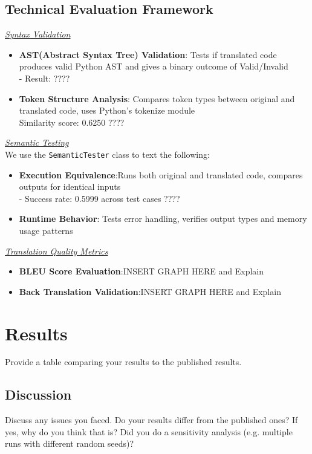 \documentclass[11pt,a4paper]{article}
\begin{document}
\subsection{Technical Evaluation Framework}
\textit{\underline{Syntax Validation}}
\begin{itemize}[itemsep=0pt, topsep=0pt]
    \item \textbf{AST(Abstract Syntax Tree) Validation}: Tests if translated code produces valid Python AST and gives a binary outcome of Valid/Invalid\\
    - Result: ????
    \item \textbf{Token Structure Analysis}: Compares token types between original and translated code, uses Python's tokenize module\\
    Similarity score: 0.6250 ????
\end{itemize}
\textit{\underline{Semantic Testing}}\\We use the \texttt{SemanticTester} class to text the following:
\begin{itemize}[itemsep=0pt, topsep=0pt]
    \item \textbf{Execution Equivalence}:Runs both original and translated code, compares outputs for identical inputs\\
    - Success rate: 0.5999 across test cases ????
    \item \textbf{Runtime Behavior}: Tests error handling, verifies output types and memory usage patterns
\end{itemize}
\textit{\underline{Translation Quality Metrics}}
\begin{itemize}
  \item \textbf{BLEU Score Evaluation}:INSERT GRAPH HERE and Explain
  \item \textbf{Back Translation Validation}:INSERT GRAPH HERE and Explain
\end{itemize}
\section{Results}
Provide a table comparing your results to the published results.

\subsection{Discussion}
Discuss any issues you faced. Do your results differ from the published ones? If yes, why do you think that is? Did you do a sensitivity analysis (e.g. multiple runs with different random seeds)?
\end{document}
